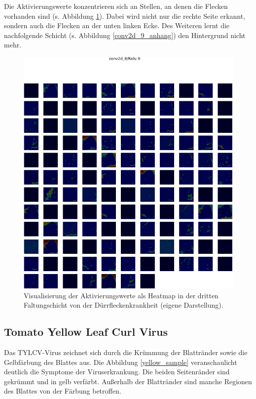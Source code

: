 Die Aktivierungswerte konzentrieren sich an Stellen, an denen die Flecken vorhanden sind (s. Abbildung \ref{conv2d_8_heat_early}). Dabei wird nicht nur die rechte Seite erkannt, sondern auch die Flecken an der unten linken Ecke. Des Weiteren lernt die nachfolgende Schicht (s. Abbildung \ref{conv2d_9_anhang}) den Hintergrund nicht mehr.

\begin{figure}[h!]
	\centering
	\includegraphics[width=\textwidth]{visualisierungen/early/heatmap_mit/conv2d_8.png}
	\caption{Visualisierung der Aktivierungswerte als Heatmap in der dritten Faltungschicht von der Dürrfleckenkrankheit (eigene Darstellung).}
	\label{conv2d_8_heat_early}
\end{figure}





\newpage
\subsection{Tomato Yellow Leaf Curl Virus}

Das TYLCV-Virus zeichnet sich durch die Krümmung der Blattränder sowie die Gelbfärbung des Blattes aus. Die Abbildung \ref{yellow_sample} veranschaulicht deutlich die Symptome der Viruserkrankung. Die beiden Seitenränder sind gekrümmt und in gelb verfärbt. Außerhalb der Blattränder sind manche Regionen des Blattes von der Färbung betroffen.


